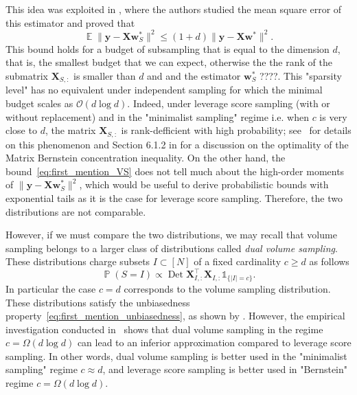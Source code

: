 \documentclass[twoside,11pt]{book}
\numberwithin{theorem}{chapter}
\numberwithin{definition}{chapter}
\numberwithin{proposition}{chapter}
\numberwithin{corollary}{chapter}
\numberwithin{example}{chapter}
\numberwithin{lemma}{chapter}
\numberwithin{assumption}{chapter}
\numberwithin{equation}{chapter}
\numberwithin{figure}{chapter}
\DeclareMathOperator{\Det}{Det}
\DeclareMathOperator{\Tran}{\intercal}
\DeclareMathOperator{\EX}{\mathbb{E}}
\DeclareMathOperator{\Prb}{\mathbb{P}}
\begin{document}
This idea was exploited in \parencite{DeWa17}, where the authors studied the mean square error of this estimator and proved that
\begin{equation}\label{eq:first_mention_VS}
\EX \|\bm{y}-\bm{X}\bm{w}_{S}^{*}\|^{2} \leq (1+d) \|\bm{y} - \bm{X}\bm{w}^{*}\|^{2}.
\end{equation} 
This bound holds for a budget of subsampling that is equal to the dimension $d$, that is, the smallest budget that we can expect, otherwise the the rank of the submatrix $\bm{X}_{S,:}$ is smaller than $d$ and and the estimator $\bm{w}_{S}^{*}$ ????. This "sparsity level" has no equivalent under independent sampling for which the minimal budget scales as $\mathcal{O}(d \log d)$. Indeed, under leverage score sampling (with or without replacement) and in the "minimalist sampling" regime i.e. when $c$ is very close to $d$, the matrix $\bm{X}_{S,:}$ is rank-defficient with high probability; see~\parencite{IpWe14} for details on this phenomenon and Section 6.1.2 in \parencite{Tro15} for a discussion on the optimality of the Matrix Bernstein concentration inequality. On the other hand, the bound~\eqref{eq:first_mention_VS} does not tell much about the high-order moments of $\|\bm{y}-\bm{X}\bm{w}_{S}^{*}\|^{2}$, which would be useful to derive probabilistic bounds with exponential tails as it is the case for leverage score sampling. 
Therefore, the two distributions are not comparable.

However, if we must compare the two distributions, we may recall that
 volume sampling belongs to a larger class of distributions called \emph{dual volume sampling}. These distributions charge subsets $I \subset [N]$ of a fixed cardinality $c \geq d$ as follows
\begin{equation}\label{eq:second_mention_volume_sampling}
\Prb(S = I) \propto \Det \bm{X}_{I,:}^{\Tran} \bm{X}_{I,:}^{\phantom{\Tran}} \mathbb{1}_{ \{|I| = c \}}.
\end{equation} 
In particular the case $c = d$ corresponds to the volume sampling distribution. These distributions satisfy the unbiasedness property~\eqref{eq:first_mention_unbiasedness}, as shown by \cite{DeWa17}. However, the empirical investigation conducted in~\parencite{DeWaHs18} shows that dual volume sampling in the regime $c = \Omega(d \log d)$ can lead to an inferior approximation compared to leverage score sampling. In other words, dual volume sampling is better used in the "minimalist sampling" regime $c \approx d$, and leverage score sampling is better used in "Bernstein" regime $c = \Omega(d \log d)$.
\end{document}
